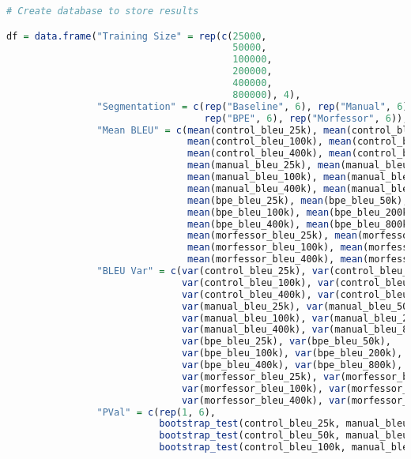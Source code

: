 \documentclass[11pt]{article}
\begin{document}
\begin{lstlisting}[language=R]
# Create database to store results

df = data.frame("Training Size" = rep(c(25000, 
                                        50000,
                                        100000, 
                                        200000, 
                                        400000, 
                                        800000), 4),
                "Segmentation" = c(rep("Baseline", 6), rep("Manual", 6), 
                                   rep("BPE", 6), rep("Morfessor", 6)),
                "Mean BLEU" = c(mean(control_bleu_25k), mean(control_bleu_50k),
                                mean(control_bleu_100k), mean(control_bleu_200k),
                                mean(control_bleu_400k), mean(control_bleu_800k),
                                mean(manual_bleu_25k), mean(manual_bleu_50k), 
                                mean(manual_bleu_100k), mean(manual_bleu_200k),
                                mean(manual_bleu_400k), mean(manual_bleu_800k),
                                mean(bpe_bleu_25k), mean(bpe_bleu_50k),
                                mean(bpe_bleu_100k), mean(bpe_bleu_200k),
                                mean(bpe_bleu_400k), mean(bpe_bleu_800k),
                                mean(morfessor_bleu_25k), mean(morfessor_bleu_50k), 
                                mean(morfessor_bleu_100k), mean(morfessor_bleu_200k),
                                mean(morfessor_bleu_400k), mean(morfessor_bleu_800k)),
                "BLEU Var" = c(var(control_bleu_25k), var(control_bleu_50k),
                               var(control_bleu_100k), var(control_bleu_200k),
                               var(control_bleu_400k), var(control_bleu_800k),
                               var(manual_bleu_25k), var(manual_bleu_50k), 
                               var(manual_bleu_100k), var(manual_bleu_200k),
                               var(manual_bleu_400k), var(manual_bleu_800k),
                               var(bpe_bleu_25k), var(bpe_bleu_50k),
                               var(bpe_bleu_100k), var(bpe_bleu_200k),
                               var(bpe_bleu_400k), var(bpe_bleu_800k),
                               var(morfessor_bleu_25k), var(morfessor_bleu_50k), 
                               var(morfessor_bleu_100k), var(morfessor_bleu_200k),
                               var(morfessor_bleu_400k), var(morfessor_bleu_800k)),
                "PVal" = c(rep(1, 6), 
                           bootstrap_test(control_bleu_25k, manual_bleu_25k),
                           bootstrap_test(control_bleu_50k, manual_bleu_50k),
                           bootstrap_test(control_bleu_100k, manual_bleu_100k),

\end{lstlisting}
\end{document}
